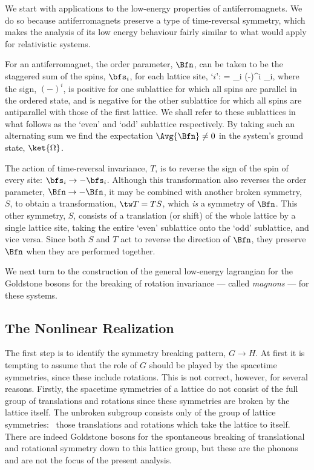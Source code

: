 \documentclass[12pt]{report}
\begin{document}
We start with applications to the low-energy properties of
antiferromagnets. We do so because antiferromagnets
preserve a type of time-reversal symmetry, which makes the
analysis of its low energy behaviour fairly similar to what
would apply for relativistic systems.

For an antiferromagnet, the order parameter, $\Bfn$, can be
taken to be the staggered sum of the spins, $\bfs_i$, for
each lattice site, `$i$':
%
\eq
\label{aforderparam}
\Bfn = \sum_i (-)^i \; \bfs_i,
\eeq
%
where the sign, $(-)^i$, is positive for one sublattice for
which all spins are parallel in the ordered state, and is
negative for the other sublattice for which all spins are
antiparallel with those of the first lattice. We shall
refer to these sublattices in what follows as the `even'
and `odd' sublattice respectively. By taking such an
alternating sum we find the expectation $\Avg{ \Bfn} \neq
0$ in the system's ground state, $\ket{\Omega}$.

The action of time-reversal invariance, $T$, is to reverse
the sign of the spin of every site: $\bfs_i \to - \bfs_i$.
Although this transformation also reverses the order
parameter, $\Bfn \to 
- \Bfn$, it may be combined with another broken symmetry,
$S$, to obtain a transformation, $\tw T = TS$, which {\em
is} a symmetry of $\Bfn$. This other symmetry, $S$,
consists of a translation (or shift) of the whole lattice
by a single lattice site, taking the entire `even'
sublattice onto the `odd' sublattice, and vice versa. Since
both $S$ and $T$ act to reverse the direction of $\Bfn$,
they preserve $\Bfn$ when they are performed together.

We next turn to the construction of the general low-energy
lagrangian for the Goldstone bosons for the breaking of
rotation invariance --- called {\em magnons} --- for these
systems.

\subsection{The Nonlinear Realization}

The first step is to identify the symmetry breaking
pattern, $G \to H$. At first it is tempting to assume that
the role of $G$ should be played by the spacetime
symmetries, since these include rotations. This is not
correct, however, for several reasons. Firstly, the
spacetime symmetries of a lattice do not consist of the
full group of translations and rotations since these
symmetries are broken by the lattice itself. The unbroken
subgroup consists only of the group of lattice symmetries:
\ie\ those translations and rotations which take the
lattice to itself. There are indeed Goldstone bosons for
the spontaneous breaking of translational and rotational
symmetry down to this lattice group, but these are the
phonons and are not the focus of the present analysis.
\end{document}
